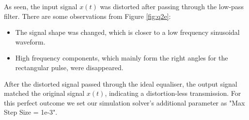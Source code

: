 \documentclass[11pt]{article}
\begin{document}
\begin{enumerate}[label=(\alph*)]
As seen, the input signal $x(t)$ was distorted after passing through the low-pass filter. There are some observations from Figure \ref{fig:q2e}: 
\begin{itemize}
  \item The signal shape was changed, which is closer to a low frequency sinusoidal waveform. 
  \item High frequency components, which mainly form the right angles for the rectangular pulse, were disappeared.
\end{itemize}
After the distorted signal passed through the ideal equaliser, the output signal matched the original signal $x(t)$, indicating a distortion-less transmission. For this perfect outcome we set our simulation solver's additional parameter as "Max Step Size = 1e-3".
\end{enumerate}

\end{document}
